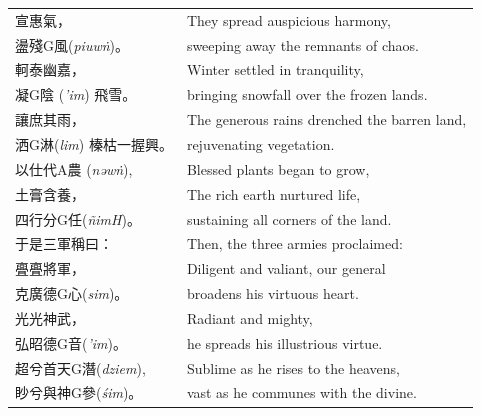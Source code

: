 \begin{longtable}{p{} p{}}

宣惠氣， & They spread auspicious harmony,\\
盪殘G風(\textit{piuwṅ})。%
& sweeping away the remnants of chaos.\\

軻泰幽嘉， & Winter settled in tranquility,\\
凝G陰 (\textit{'im})%
飛雪。 & bringing snowfall over the frozen lands.\\

讓庶其雨， & The generous rains drenched the barren land,\\
洒G淋(\textit{lim}) %
榛枯一握興。 & rejuvenating vegetation.\\

以仕代A農 (\textit{nəwṅ}),%
& Blessed plants began to grow,\\

土膏含養， & The rich earth nurtured life,\\
四行分G任(\textit{ñimH})。%
& sustaining all corners of the land.\\

于是三軍稱曰： & Then, the three armies proclaimed:\\

亹亹將軍， & Diligent and valiant, our general\\
克廣德G心(\textit{sim})。%
& broadens his virtuous heart.\\

光光神武， & Radiant and mighty,\\
弘昭德G音(\textit{'im})。%
& he spreads his illustrious virtue.\\

超兮首天G潛(\textit{dziem}),%
& Sublime as he rises to the heavens,\\
眇兮與神G參(\textit{śim})。%
& vast as he communes with the divine.\\

\end{longtable}


